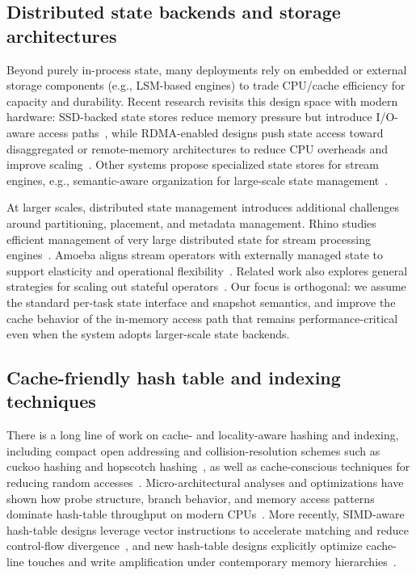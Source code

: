 \documentclass[sigconf]{acmart}
\begin{document}
\subsection{Distributed state backends and storage architectures}
Beyond purely in-process state, many deployments rely on embedded or external storage components (e.g., LSM-based engines) to trade CPU/cache efficiency for capacity and durability. Recent research revisits this design space with modern hardware: SSD-backed state stores reduce memory pressure but introduce I/O-aware access paths~\cite{lee2018ssdstate}, while RDMA-enabled designs push state access toward disaggregated or remote-memory architectures to reduce CPU overheads and improve scaling~\cite{delmonte2022rdma}. Other systems propose specialized state stores for stream engines, e.g., semantic-aware organization for large-scale state management~\cite{lee2023flowkv}.

At larger scales, distributed state management introduces additional challenges around partitioning, placement, and metadata management. Rhino studies efficient management of very large distributed state for stream processing engines~\cite{delmonte2020rhino}. Amoeba aligns stream operators with externally managed state to support elasticity and operational flexibility~\cite{papaioannou2021amoeba}. Related work also explores general strategies for scaling out stateful operators~\cite{mudassar2019scalingout}. Our focus is orthogonal: we assume the standard per-task state interface and snapshot semantics, and improve the cache behavior of the in-memory access path that remains performance-critical even when the system adopts larger-scale state backends.

\subsection{Cache-friendly hash table and indexing techniques}
There is a long line of work on cache- and locality-aware hashing and indexing, including compact open addressing and collision-resolution schemes such as cuckoo hashing and hopscotch hashing~\cite{pagh2004cuckoo,herlihy2008hopscotch}, as well as cache-conscious techniques for reducing random accesses~\cite{askitis2005cache}. Micro-architectural analyses and optimizations have shown how probe structure, branch behavior, and memory access patterns dominate hash-table throughput on modern CPUs~\cite{ross2007hashprobes}. More recently, SIMD-aware hash-table designs leverage vector instructions to accelerate matching and reduce control-flow divergence~\cite{shankar2019simdhash}, and new hash-table designs explicitly optimize cache-line touches and write amplification under contemporary memory hierarchies~\cite{pandey2023iceberght}.
\end{document}
